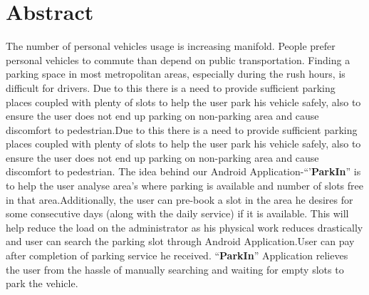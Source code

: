 \documentclass[12pt, english]{article}
\begin{document}
\newcommand{\CC}{C\nolinebreak\hspace{-.05em}\raisebox{.4ex}{\tiny\bf +}\nolinebreak\hspace{-.10em}\raisebox{.4ex}{\tiny\bf +}}
\def\CC{{C\nolinebreak[4]\hspace{-.05em}\raisebox{.4ex}{\tiny\bf ++}}}

\tableofcontents
\newpage
\section{Abstract}
The number of personal vehicles usage is increasing manifold. People prefer personal vehicles to commute than depend on public transportation. Finding a parking space in most metropolitan areas, especially during the rush hours, is difficult for drivers. Due to this there is a need to provide sufficient parking places coupled with plenty of slots to help the user park his vehicle safely, also to ensure the user does not end up parking on non-parking area and cause discomfort to pedestrian.Due to this there is a need to provide sufficient parking places coupled with plenty of slots to help the user park his vehicle safely, also to ensure the user does not end up parking on non-parking area and cause discomfort to pedestrian. The idea behind our Android Application-“'\textbf{ParkIn}” is to help the user analyse area’s where parking is available and number of slots free in that area.Additionally, the user can pre-book a slot in the area he desires for some consecutive days (along with the daily service) if it is available. This will help reduce the load on the administrator as his physical work reduces drastically and user can search the parking slot through Android Application.User can pay after completion of parking service he received. “\textbf{ParkIn}” Application relieves the user
from the hassle of manually searching and waiting for empty slots to park the vehicle.
\end{document}
